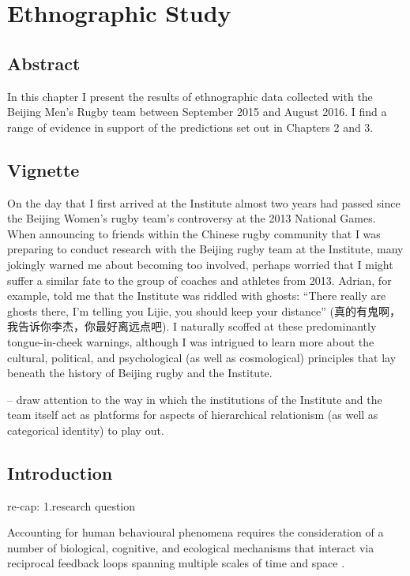 


\chapter{\label{4ethnographicField}Ethnographic Study}

\minitoc
\section{Abstract}
In this chapter I present the results of ethnographic data collected with the Beijing Men's Rugby team between September 2015 and August 2016.  I find a range of evidence in support of the predictions set out in Chapters 2 and 3.



\section{Vignette}

On the day that I first arrived at the Institute almost two years had passed since the Beijing Women's rugby team's controversy at the 2013 National Games.  When announcing to friends within the Chinese rugby community that I was preparing to conduct research with the Beijing rugby team at the Institute, many jokingly warned me about becoming too involved, perhaps worried that I might suffer a similar fate to the group of coaches and athletes from 2013.  Adrian, for example, told me that the Institute was riddled with ghosts: ``There really are ghosts there, I'm telling you Lijie, you should keep your distance'' (真的有鬼啊，我告诉你李杰，你最好离远点吧).  I naturally scoffed at these predominantly tongue-in-cheek warnings, although I was intrigued to learn more about the cultural, political, and psychological (as well as cosmological) principles that lay beneath the history of Beijing rugby and the Institute.


-- draw attention to the way in which the institutions of the Institute and the team itself act as platforms for aspects of hierarchical relationism (as well as categorical identity) to play out.



\section{Introduction}


re-cap:
1.research question


Accounting for human behavioural phenomena requires the consideration of a number of biological, cognitive, and ecological mechanisms that interact via reciprocal feedback loops spanning multiple scales of time and space \citep{Fuentes2015}.

